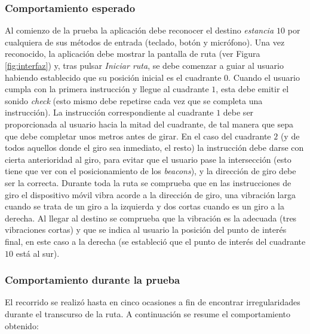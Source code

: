 \subsubsection*{Comportamiento esperado}

Al comienzo de la prueba la aplicación debe reconocer el destino \textit{estancia $10$} por cualquiera de sus métodos de entrada (teclado, botón y micrófono). Una vez reconocido, la aplicación debe mostrar la pantalla de ruta (ver Figura \ref{fig:interfaz}) y, tras pulsar \textit{Iniciar ruta}, se debe comenzar a guiar al usuario habiendo establecido que su posición inicial es el cuadrante $0$. Cuando el usuario cumpla con la primera instrucción y llegue al cuadrante $1$, esta debe emitir el sonido \textit{check} (esto mismo debe repetirse cada vez que se completa una instrucción). La instrucción correspondiente al cuadrante $1$ debe ser proporcionada al usuario hacia la mitad del cuadrante, de tal manera que sepa que debe completar unos metros antes de girar. En el caso del cuadrante $2$ (y de todos aquellos donde el giro sea inmediato, el resto) la instrucción debe darse con cierta anterioridad al giro, para evitar que el usuario pase la intersección (esto tiene que ver con el posicionamiento de los \textit{beacons}), y la dirección de giro debe ser la correcta. Durante toda la ruta se comprueba que en las instrucciones de giro el dispositivo móvil vibra acorde a la dirección de giro, una vibración larga cuando se trata de un giro a la izquierda y dos cortas cuando es un giro a la derecha. Al llegar al destino se comprueba que la vibración es la adecuada (tres vibraciones cortas) y que se indica al usuario la posición del punto de interés final, en este caso a la derecha (se estableció que el punto de interés del cuadrante $10$ está al sur).


\subsubsection*{Comportamiento durante la prueba}
 
El recorrido se realizó hasta en cinco ocasiones a fin de encontrar irregularidades durante el transcurso de la ruta. A continuación se resume el comportamiento obtenido:

